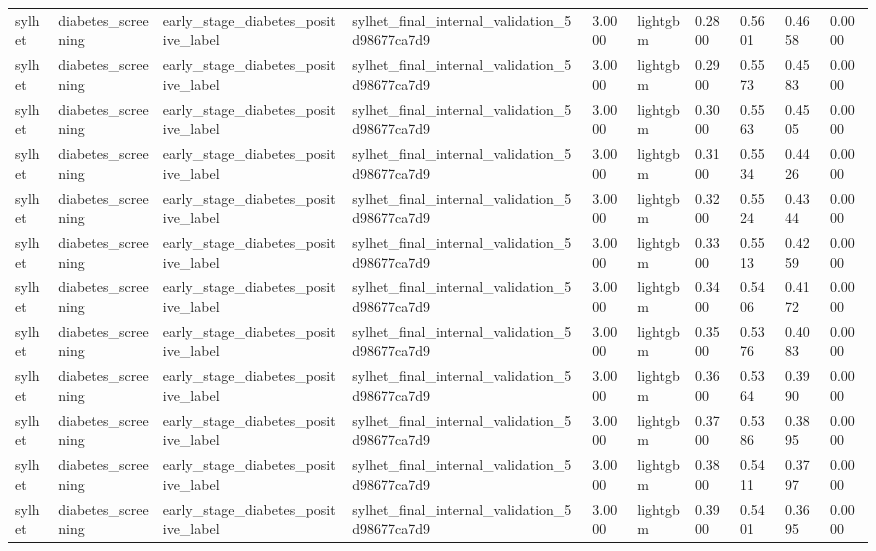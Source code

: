 \begin{tabular}{llllllllll}
sylhet & diabetes\_screening & early\_stage\_diabetes\_positive\_label & sylhet\_final\_internal\_validation\_5d98677ca7d9 & 3.0000 & lightgbm & 0.2800 & 0.5601 & 0.4658 & 0.0000 \\
sylhet & diabetes\_screening & early\_stage\_diabetes\_positive\_label & sylhet\_final\_internal\_validation\_5d98677ca7d9 & 3.0000 & lightgbm & 0.2900 & 0.5573 & 0.4583 & 0.0000 \\
sylhet & diabetes\_screening & early\_stage\_diabetes\_positive\_label & sylhet\_final\_internal\_validation\_5d98677ca7d9 & 3.0000 & lightgbm & 0.3000 & 0.5563 & 0.4505 & 0.0000 \\
sylhet & diabetes\_screening & early\_stage\_diabetes\_positive\_label & sylhet\_final\_internal\_validation\_5d98677ca7d9 & 3.0000 & lightgbm & 0.3100 & 0.5534 & 0.4426 & 0.0000 \\
sylhet & diabetes\_screening & early\_stage\_diabetes\_positive\_label & sylhet\_final\_internal\_validation\_5d98677ca7d9 & 3.0000 & lightgbm & 0.3200 & 0.5524 & 0.4344 & 0.0000 \\
sylhet & diabetes\_screening & early\_stage\_diabetes\_positive\_label & sylhet\_final\_internal\_validation\_5d98677ca7d9 & 3.0000 & lightgbm & 0.3300 & 0.5513 & 0.4259 & 0.0000 \\
sylhet & diabetes\_screening & early\_stage\_diabetes\_positive\_label & sylhet\_final\_internal\_validation\_5d98677ca7d9 & 3.0000 & lightgbm & 0.3400 & 0.5406 & 0.4172 & 0.0000 \\
sylhet & diabetes\_screening & early\_stage\_diabetes\_positive\_label & sylhet\_final\_internal\_validation\_5d98677ca7d9 & 3.0000 & lightgbm & 0.3500 & 0.5376 & 0.4083 & 0.0000 \\
sylhet & diabetes\_screening & early\_stage\_diabetes\_positive\_label & sylhet\_final\_internal\_validation\_5d98677ca7d9 & 3.0000 & lightgbm & 0.3600 & 0.5364 & 0.3990 & 0.0000 \\
sylhet & diabetes\_screening & early\_stage\_diabetes\_positive\_label & sylhet\_final\_internal\_validation\_5d98677ca7d9 & 3.0000 & lightgbm & 0.3700 & 0.5386 & 0.3895 & 0.0000 \\
sylhet & diabetes\_screening & early\_stage\_diabetes\_positive\_label & sylhet\_final\_internal\_validation\_5d98677ca7d9 & 3.0000 & lightgbm & 0.3800 & 0.5411 & 0.3797 & 0.0000 \\
sylhet & diabetes\_screening & early\_stage\_diabetes\_positive\_label & sylhet\_final\_internal\_validation\_5d98677ca7d9 & 3.0000 & lightgbm & 0.3900 & 0.5401 & 0.3695 & 0.0000 \\

\end{tabular}
